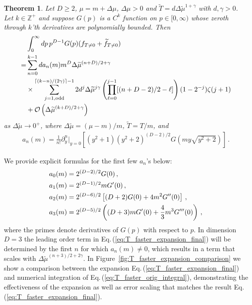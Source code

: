 \documentclass[sn-mathphys,Numbered]{sn-jnl}
\newcommand{\req}[1]{Eq.\,(\ref{#1})}
\newcommand{\rf}[1]{Figure~{\ref{#1}}}
\newcommand*{\xred}{\color{black}}
\newtheorem{theorem}{Theorem}
\begin{document}
\begin{theorem}\label{thms:T_decay_faster}
Let $D\geq 2$, $\mu=m+\Delta\mu$, $\Delta\mu>0$ and $\widetilde{T}=d\Delta\widetilde{\mu}^{1+\gamma}$ {\xred with} $d,\gamma>0$. Let $k\in\mathbb{Z}^+$ and suppose $G(p)$ is a $C^k$ function on $p\in[0,\infty)$ whose zeroth through $k$'th derivatives are polynomially bounded. Then
\begin{align}
 &\int_0^\infty dp\, p^{D-1} G(p)(f_{T\neq 0}+\widetilde{f}_{T\neq 0})\label{eq:T_faster_orig_integral}\\
 =& \sum_{n=0}^{k-1} da_n(m)m^{D}\Delta\widetilde{\mu}^{(n+D)/2+\gamma}\label{eq:T_faster_expansion_final}\\
 &\times\sum_{j=1,\mathrm{odd}}^{\lceil(k-n)/(2\gamma)\rceil-1}
 2d^j\Delta\widetilde{\mu}^{j\gamma}\left(\prod_{\ell=0}^{j-1}[(n+D-2)/2-\ell] \right)(1-2^{-j})\zeta(j+1) \notag\\
 &+\mathcal{O}\left(\Delta\widetilde{\mu}^{(k+D)/2+\gamma}\right)\notag
\end{align} 
as $\Delta\widetilde{\mu}\to 0^+$, where $\Delta\widetilde{\mu}=(\mu-m)/m$, $\widetilde{T}=T/m$, and
\begin{align}\label{eq:an_def}
a_n(m)=\frac{1}{n!}\partial_y^n|_{y=0}\left[ (y^2+1)( y^2+2)^{(D-2)/2} G\left(my\sqrt{y^2+2}\right)\right]\,.
\end{align}
\end{theorem}
We provide explicit formulas for the first few $a_n$'s below:
\begin{align}\label{eq:first_few_a_ns}
 &a_0(m)=2^{(D-2)/2} G(0)\,,\\
 &a_1(m)=2^{(D-1)/2}mG^\prime(0)\,,\notag\\
 &a_2(m)=2^{(D-6)/2}\left[(D+2)G(0)+4m^2 G^{\prime\prime}(0)\right]\,,\notag\\
 &a_3(m)=2^{(D - 5)/2} \left((D + 3) m G^\prime(0) + \frac{4}{3}m^3 G^{\prime\prime\prime}(0) \right)\,,\notag
\end{align}
where the primes denote derivatives of $G(p)$ with respect to $p$. In dimension $D=3$ the leading order term in \req{eq:T_faster_expansion_final} will be determined by the first $n$ for which $a_n(m)\neq 0$, which results in a term that scales with $\Delta\widetilde{\mu}^{(n+3)/2+2\gamma}$. In \rf{fig:T_faster_expansion_comparison} we show a comparison between the expansion \req{eq:T_faster_expansion_final} and numerical integration of \req{eq:T_faster_orig_integral}, demonstrating the effectiveness of the expansion as well as error scaling that matches the result \req{eq:T_faster_expansion_final}.
\end{document}
